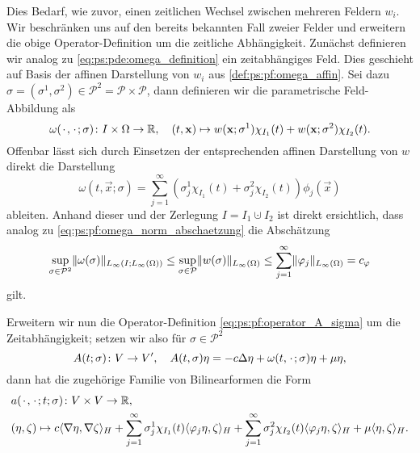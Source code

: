 Dies Bedarf, wie zuvor, einen zeitlichen Wechsel zwischen mehreren Feldern $w_{i}$.
Wir beschränken uns auf den bereits bekannten Fall zweier Felder und erweitern die obige Operator-Definition um die zeitliche Abhängigkeit.
Zunächst definieren wir analog zu \cref{eq:ps:pde:omega_definition} ein zeitabhängiges Feld.
Dies geschieht auf Basis der affinen Darstellung von $w_{i}$ aus \cref{def:ps:pf:omega_affin}.
Sei dazu $\sigma = (\sigma^{1}, \sigma^{2}) \in \mathcal P^{2} =  \mathcal P \times \mathcal P$, dann definieren wir die parametrische Feld-Abbildung als
\begin{equation}
\label{eq:ps:pde:omega_definition_affin}
    \omega({\mkern2mu\cdot\mkern2mu}, {\mkern2mu\cdot\mkern2mu}; \sigma) \colon I \times \Omega \to \mathbb{R}, \quad (t, \mathbf{x}) \mapsto
    w(\mathbf{x}; \sigma^{1}) \chi_{I_{1}}(t) + w(\mathbf{x}; \sigma^{2}) \chi_{I_{2}}(t).
\end{equation}
Offenbar lässt sich durch Einsetzen der entsprechenden affinen Darstellung von $w$ direkt die Darstellung
\begin{equation}
    \omega(t, \vec{x}; \sigma) = \sum_{j = 1}^{\infty} (\sigma^{1}_{j} \chi_{I_{1}}(t) + \sigma^{2}_{j} \chi_{I_{2}}(t)) \phi_{j}(\vec x)
\end{equation}
ableiten.
Anhand dieser und der Zerlegung $I = I_{1} \cupdot I_{2}$ ist direkt ersichtlich, dass analog zu \cref{eq:ps:pf:omega_norm_abschaetzung} die Abschätzung
\begin{equation}
\label{eq:abschaetzung_feld_sigma_zeit}
    \sup_{\sigma \in \mathcal P^{2}} \lVert\omega(\sigma)\rVert_{L_{\infty}(I; L_{\infty}(\Omega))} \leq \sup_{\sigma \in \mathcal P} \lVert w(\sigma)\rVert_{L_{\infty}(\Omega)} \leq \sum_{j = 1}^{\infty} \lVert\varphi_{j}\rVert_{L_{\infty}(\Omega)} = c_{\varphi}
\end{equation}
gilt.

Erweitern wir nun die Operator-Definition \cref{eq:ps:pf:operator_A_sigma} um die Zeitabhängigkeit; setzen wir also für $\sigma \in \mathcal P^{2}$
\begin{equation}
    \label{eq:ps:pf:operator_A_sigma_zeit}
    A(t; \sigma) \colon V \to V', \quad A(t, \sigma) \eta = -c \Delta \eta + \omega(t, {\mkern2mu\cdot\mkern2mu}; \sigma) \eta + \mu \eta,
\end{equation}
dann hat die zugehörige Familie von Bilinearformen die Form
\begin{equation}
    \label{eq:ps:pf:bilineaform_a_sigma_zeit}
    \begin{aligned}
        &a({\mkern2mu\cdot\mkern2mu}, {\mkern2mu\cdot\mkern2mu}; t; \sigma) \colon V \times V \to \mathbb{R}, \\
        &(\eta, \zeta) \mapsto c\langle\nabla \eta,\nabla \zeta\rangle_{H} + \sum_{j = 1}^{\infty} \sigma^{1}_{j} \chi_{I_{1}}(t) \langle\varphi_{j} \eta,\zeta\rangle_{H} + \sum_{j = 1}^{\infty} \sigma^{2}_{j} \chi_{I_{2}}(t) \langle\varphi_{j} \eta,\zeta\rangle_{H} + \mu \langle\eta,\zeta\rangle_{H}.
    \end{aligned}
\end{equation}

